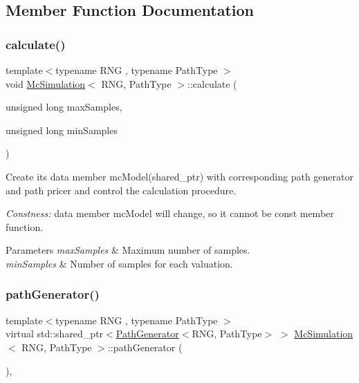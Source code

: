 \subsection{Member Function Documentation}
\hypertarget{class_mc_simulation_a9d323dca5d0a6c50d6fbab6ea564a1f3}{}\label{class_mc_simulation_a9d323dca5d0a6c50d6fbab6ea564a1f3} 
\subsubsection{\texorpdfstring{calculate()}{calculate()}}
{\footnotesize\ttfamily template$<$typename R\+NG , typename Path\+Type $>$ \\
void \hyperlink{class_mc_simulation}{Mc\+Simulation}$<$ R\+NG, Path\+Type $>$\+::calculate (\begin{DoxyParamCaption}\item[{unsigned long}]{max\+Samples,  }\item[{unsigned long}]{min\+Samples }\end{DoxyParamCaption})}



Create its data member mc\+Model(shared\+\_\+ptr) with corresponding path generator and path pricer and control the calculation procedure. 

{\itshape Constness\+:} data member mc\+Model will change, so it cannot be const member function. 
\begin{DoxyParams}{Parameters}
{\em max\+Samples} & Maximum number of samples. \\
\hline
{\em min\+Samples} & Number of samples for each valuation. \\
\hline
\end{DoxyParams}
\hypertarget{class_mc_simulation_ad2338ca624a9bbfaec8e4d882471d546}{}\label{class_mc_simulation_ad2338ca624a9bbfaec8e4d882471d546} 
\subsubsection{\texorpdfstring{path\+Generator()}{pathGenerator()}}
{\footnotesize\ttfamily template$<$typename R\+NG , typename Path\+Type $>$ \\
virtual std\+::shared\+\_\+ptr$<$\hyperlink{class_path_generator}{Path\+Generator}$<$R\+NG, Path\+Type$>$ $>$ \hyperlink{class_mc_simulation}{Mc\+Simulation}$<$ R\+NG, Path\+Type $>$\+::path\+Generator (\begin{DoxyParamCaption}{ }\end{DoxyParamCaption})\hspace{0.3cm}{\ttfamily [private]}, {}}



